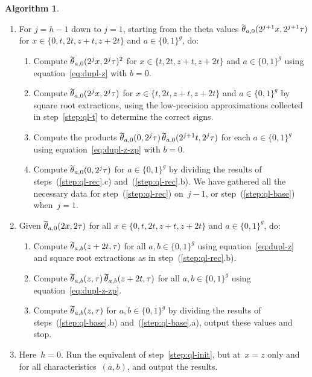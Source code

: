 \documentclass[12pt,oneside]{amsart}
\numberwithin{equation}{section}
\theoremstyle{definition}
\newtheorem{algorithm}[equation]{Algorithm}
\DeclareMathOperator{\thetatilde}{\rlap{\raisebox{-0.1ex}{$\widetilde{\phantom{\,t}}$}}\theta}
\begin{document}
\begin{algorithm}
\begin{enumerate}
\begin{enumerate}
      approximate exponential factors, to get
      $\thetatilde_{a,0}(2^hx, 2^h\tau)$.
    \end{enumerate}
  \item \label{step:ql-rec} For $j = h-1$ down to $j = 1$, starting from the
    theta values $\thetatilde_{a,0}(2^{j+1}x, 2^{j+1}\tau)$ for
    $x\in \{0,t,2t,z+t,z+2t\}$ and $a\in \{0,1\}^g$, do:
    \begin{enumerate}
    \item Compute $\thetatilde_{a,0}(2^jx, 2^{j}\tau)^2$ for
      $x\in \{t, 2t, z+t, z+2t\}$ and $a\in \{0,1\}^g$
      using equation~\eqref{eq:dupl-z} with $b=0$.
    \item Compute $\thetatilde_{a,0}(2^{j}x, 2^{j}\tau)$ for
      $x\in \{t, 2t, z+t, z+2t\}$ and $a\in \{0,1\}^g$ by square
      root extractions, using the low-precision approximations collected in
      step~\eqref{step:ql-t} to determine the correct signs.
    \item Compute the products
      $\thetatilde_{a,0}(0,2^{j}\tau) \thetatilde_{a,0}(2^{j+1}t, 2^{j}\tau)$ for each
      $a\in \{0,1\}^g$ using equation~\eqref{eq:dupl-z-zp} with $b=0$.
    \item Compute $\thetatilde_{a,0}(0,2^{j}\tau)$ for $a\in \{0,1\}^g$ by
      dividing the results of steps~(\ref{step:ql-rec}.c)
      and~(\ref{step:ql-rec}.b). We have gathered all the necessary data for
      step~(\ref{step:ql-rec}) on~$j-1$, or step~(\ref{step:ql-base}) when~$j=1$.
    \end{enumerate}
  \item \label{step:ql-base} Given $\thetatilde_{a,0}(2x,2\tau)$ for all
    $x\in \{0,t,2t,z+t,z+2t\}$ and $a\in \{0,1\}^g$, do:
    \begin{enumerate}
    \item Compute $\thetatilde_{a,b}(z+2t,\tau)$ for all $a,b\in \{0,1\}^g$
      using equation~\eqref{eq:dupl-z} and square root extractions as in
      step~(\ref{step:ql-rec}.b).
    \item Compute
      $\thetatilde_{a,b}(z,\tau)\thetatilde_{a,b}(z+2t,\tau)$ for all
      $a,b\in \{0,1\}^g$ using equation~\eqref{eq:dupl-z-zp}.
    \item Compute $\thetatilde_{a,b}(z,\tau)$ for $a,b\in\{0,1\}^g$ by dividing
      the results of steps~(\ref{step:ql-base}.b) and~(\ref{step:ql-base}.a),
      output these values and stop.
    \end{enumerate}
  \item \label{step:ql-nothing} Here~$h=0$. Run the equivalent of
    step~\eqref{step:ql-init}, but at~$x=z$ only and for all
    characteristics~$(a,b)$, and output the results.
  \end{enumerate}
\end{algorithm}
\end{document}
